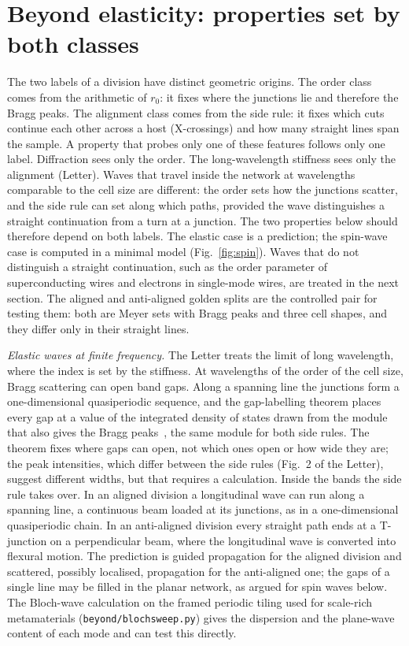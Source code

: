 \documentclass[aps,prl,onecolumn,superscriptaddress,amsmath,amssymb,floatfix]{revtex4-2}
\begin{document}
\section{Beyond elasticity: properties set by both classes}

The two labels of a division have distinct geometric origins. The order class comes from the
arithmetic of $r_0$: it fixes where the junctions lie and therefore the Bragg peaks. The
alignment class comes from the side rule: it fixes which cuts continue each other across a host
(X-crossings) and how many straight lines span the sample. A property that probes only one of
these features follows only one label. Diffraction sees only the order. The long-wavelength
stiffness sees only the alignment (Letter). Waves that travel inside the network at wavelengths
comparable to the cell size are different: the order sets how the junctions scatter, and the
side rule can set along which paths, provided the wave distinguishes a straight continuation from
a turn at a junction. The two properties below should therefore depend on both labels. The elastic
case is a prediction; the spin-wave case is computed in a minimal model (Fig.~\ref{fig:spin}). Waves that do not distinguish a straight continuation,
such as the order parameter of superconducting wires and electrons in single-mode wires, are
treated in the next section. The aligned and anti-aligned golden splits are the controlled pair
for testing them: both are Meyer sets with Bragg peaks and three cell shapes, and they differ
only in their straight lines.

\textit{Elastic waves at finite frequency.} The Letter treats the limit of long wavelength,
where the index is set by the stiffness. At wavelengths of the order of the cell size, Bragg
scattering can open band gaps. Along a spanning line the junctions form a one-dimensional
quasiperiodic sequence, and the gap-labelling theorem places every gap at a value of the
integrated density of states drawn from the module that also gives the Bragg
peaks~\cite{bellissard1992}, the same module for both side rules. The theorem fixes where gaps
can open, not which ones open or how wide they are; the peak intensities, which differ between
the side rules (Fig.~2 of the Letter), suggest different widths, but that requires a
calculation. Inside the bands the side rule takes over.
In an aligned division a longitudinal wave can run along a spanning line, a continuous beam
loaded at its junctions, as in a one-dimensional quasiperiodic chain. In an anti-aligned
division every straight path ends at a T-junction on a perpendicular beam, where the
longitudinal wave is converted into flexural motion. The prediction is guided propagation for
the aligned division and scattered, possibly localised, propagation for the anti-aligned one;
the gaps of a single line may be filled in the planar network, as argued for spin waves below. The Bloch-wave
calculation on the framed periodic tiling used for scale-rich metamaterials
(\texttt{beyond/blochsweep.py}) gives the dispersion and the plane-wave content of each mode and
can test this directly.
\end{document}
